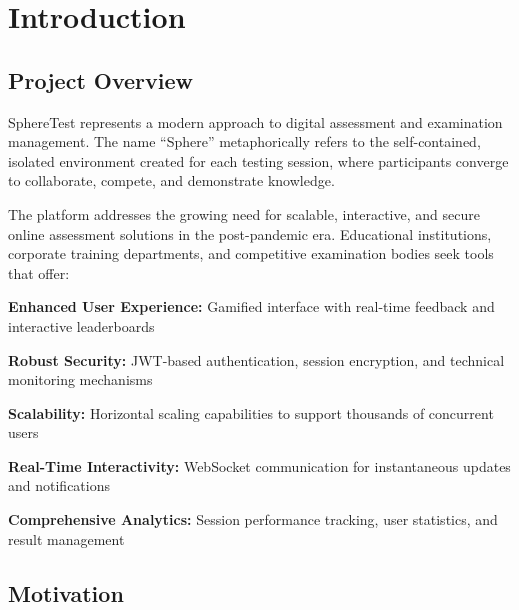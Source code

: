 \documentclass[12pt,a4paper]{report}
\newenvironment{reqbox}{%
  \begin{tcolorbox}[colback=lightgray,colframe=rulecol,
    leftrule=3pt,rightrule=0.4pt,toprule=0.4pt,bottomrule=0.4pt,
    arc=2pt,boxsep=2pt,left=4pt,right=4pt,top=3pt,bottom=3pt,breakable]
}{\end{tcolorbox}}
\begin{document}
\tableofcontents

\cleardoublepage


\mainmatter


\chapter{Introduction}

\section{Project Overview}

SphereTest represents a modern approach to digital assessment and examination management. The name ``Sphere'' metaphorically refers to the self-contained, isolated environment created for each testing session, where participants converge to collaborate, compete, and demonstrate knowledge.

The platform addresses the growing need for scalable, interactive, and secure online assessment solutions in the post-pandemic era. Educational institutions, corporate training departments, and competitive examination bodies seek tools that offer:

\begin{reqbox}
  \textbf{Enhanced User Experience:} Gamified interface with real-time feedback and interactive leaderboards

  \textbf{Robust Security:} JWT-based authentication, session encryption, and technical monitoring mechanisms
  
  \textbf{Scalability:} Horizontal scaling capabilities to support thousands of concurrent users
  
  \textbf{Real-Time Interactivity:} WebSocket communication for instantaneous updates and notifications
  
  \textbf{Comprehensive Analytics:} Session performance tracking, user statistics, and result management
\end{reqbox}

\section{Motivation}
\end{document}
